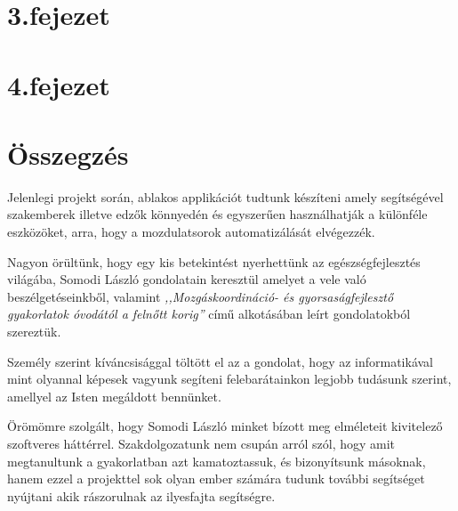\documentclass[tocnopagenum]{thesis-ekf}
\theoremstyle{definition}
\theoremstyle{remark}
\begin{document}
	

	\chapter*{3.fejezet}

	\chapter*{4.fejezet}

	\chapter*{Összegzés}
	Jelenlegi projekt során, ablakos applikációt tudtunk készíteni amely segítségével szakemberek illetve edzők könnyedén és egyszerűen használhatják a különféle eszközöket, arra, hogy a mozdulatsorok automatizálását elvégezzék.

	Nagyon örültünk, hogy egy kis betekintést nyerhettünk az egészségfejlesztés világába, Somodi László gondolatain keresztül amelyet a vele való beszélgetéseinkből, valamint \textit{,,Mozgáskoordináció- és gyorsaságfejlesztő gyakorlatok óvodától a felnőtt korig''} című alkotásában leírt gondolatokból szereztük.
	
	Személy szerint kíváncsisággal töltött el az a gondolat, hogy az informatikával mint olyannal képesek vagyunk segíteni felebarátainkon legjobb tudásunk szerint, amellyel az Isten megáldott bennünket.
	
	Örömömre szolgált, hogy Somodi László minket bízott meg elméleteit kivitelező szoftveres háttérrel. Szakdolgozatunk nem csupán arról szól, hogy amit megtanultunk a gyakorlatban azt kamatoztassuk, és bizonyítsunk másoknak, hanem ezzel a projekttel sok olyan ember számára tudunk további segítséget nyújtani akik rászorulnak az ilyesfajta segítségre.
	
\end{document}
